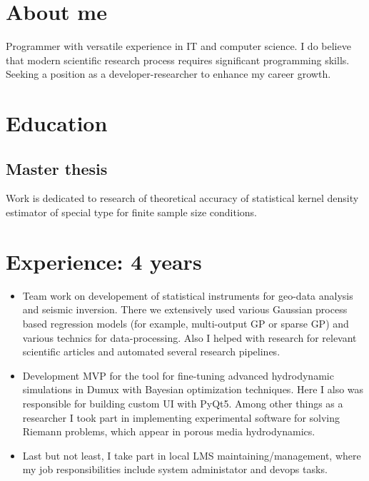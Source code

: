 \documentclass[12pt,a4paper]{moderncv}
\begin{document}
\makecvtitle

\section{About me}
Programmer with versatile experience in IT and computer science.
I do believe that modern scientific research process requires significant programming skills.
Seeking a position as a developer-researcher to enhance my career growth.

\section{Education}

\subsection{Master thesis}
Work is dedicated to research of theoretical accuracy of statistical kernel density estimator of special type for finite sample size conditions.

\section{Experience: 4 years}
\begin{itemize}
\item Team work on developement of statistical instruments for geo-data analysis and seismic inversion. There we extensively used various Gaussian process based regression models (for example, multi-output GP or sparse GP) and various technics for data-processing. Also I helped with research for relevant scientific articles and automated several research pipelines. \newline

\item Development MVP for the tool for fine-tuning advanced hydrodynamic simulations in Dumux with Bayesian optimization techniques. Here I also was responsible for building custom UI with PyQt5. Among other things as a researcher I took part in implementing experimental software for solving Riemann problems, which appear in porous media hydrodynamics. \newline

\item Last but not least, I take part in local LMS maintaining/management, where my job responsibilities include system administator and devops tasks. \newline

\end{itemize}
\end{document}
